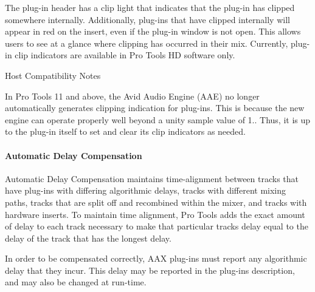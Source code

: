 \begin{DoxyItemize}
The plug-\/in header has a clip light that indicates that the plug-\/in has clipped somewhere internally. Additionally, plug-\/ins that have clipped internally will appear in red on the insert, even if the plug-\/in window is not open. This allows users to see at a glance where clipping has occurred in their mix. Currently, plug-\/in clip indicators are available in Pro Tools HD software only.

\begin{DoxyRefDesc}{Host Compatibility Notes}
\item[\mbox{\hyperlink{a00786__compatibility_notes000015}{Host Compatibility Notes}}]In Pro Tools 11 and above, the Avid Audio Engine (A\+AE) no longer automatically generates clipping indication for plug-\/ins. This is because the new engine can operate properly well beyond a unity sample value of 1.. Thus, it is up to the plug-\/in itself to set and clear its clip indicators as needed.\end{DoxyRefDesc}





\end{DoxyItemize}

\hypertarget{a00830_subsubsection__automatic_delay_compensation_}{}\paragraph{Automatic Delay Compensation}\label{a00830_subsubsection__automatic_delay_compensation_}
 Automatic Delay Compensation maintains time-\/alignment between tracks that have plug-\/ins with differing algorithmic delays, tracks with different mixing paths, tracks that are split off and recombined within the mixer, and tracks with hardware inserts. To maintain time alignment, Pro Tools adds the exact amount of delay to each track necessary to make that particular track\textquotesingle{}s delay equal to the delay of the track that has the longest delay.

In order to be compensated correctly, A\+AX plug-\/ins must report any algorithmic delay that they incur. This delay may be reported in the plug-\/in\textquotesingle{}s description, and may also be changed at run-\/time.


